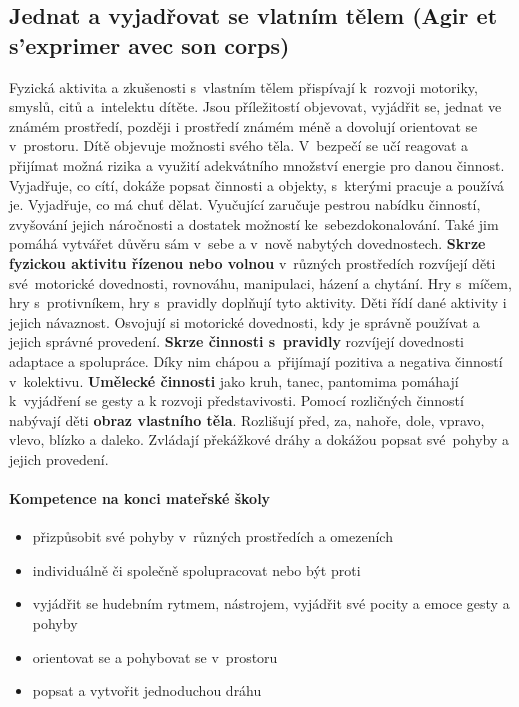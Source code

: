		\subsection{Jednat a vyjadřovat se vlatním tělem (Agir et s'exprimer avec son corps)}
			Fyzická aktivita a zkušenosti s vlastním tělem přispívají k rozvoji motoriky, smyslů, citů a intelektu dítěte. Jsou příležitostí objevovat, vyjádřit se, jednat ve známém prostředí, později i prostředí známém méně a dovolují orientovat se v prostoru. Dítě objevuje možnosti svého těla. V bezpečí se učí reagovat a přijímat možná rizika a využití adekvátního množství energie pro danou činnost. Vyjadřuje, co cítí, dokáže popsat činnosti a objekty, s kterými pracuje a používá je. Vyjadřuje, co má chuť dělat. Vyučující zaručuje  pestrou nabídku činností, zvyšování jejich náročnosti a dostatek možností ke sebezdokonalování. Také jim pomáhá vytvářet důvěru sám v sebe a v nově nabytých dovednostech. 
			\textbf{Skrze fyzickou aktivitu řízenou nebo volnou} v různých prostředích rozvíjejí děti své motorické dovednosti, rovnováhu, manipulaci, házení a chytání. Hry s míčem, hry s protivníkem, hry s pravidly doplňují tyto aktivity. Děti řídí dané aktivity i jejich návaznost. Osvojují si motorické dovednosti, kdy je správně používat a jejich správné provedení. 
			\textbf{Skrze činnosti s pravidly} rozvíjejí dovednosti adaptace a spolupráce. Díky nim chápou a přijímají pozitiva a negativa činností v kolektivu. 
			\textbf{Umělecké činnosti} jako kruh, tanec, pantomima pomáhají k vyjádření se gesty a k rozvoji představivosti.
			Pomocí rozličných činností nabývají děti \textbf{obraz vlastního těla}. Rozlišují před, za, nahoře, dole, vpravo, vlevo, blízko a daleko. Zvládají překážkové dráhy a dokážou popsat své pohyby a jejich provedení.
				\paragraph{Kompetence na konci mateřské školy}

				\begin{itemize}
				\item přizpůsobit své pohyby v různých prostředích a omezeních
				\item individuálně či společně spolupracovat nebo být proti
				\item vyjádřit se hudebním rytmem, nástrojem, vyjádřit své pocity a emoce gesty a pohyby
				\item orientovat se a pohybovat se v prostoru
				\item popsat a vytvořit jednoduchou dráhu
				\end{itemize}


